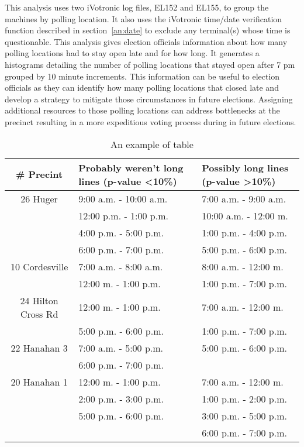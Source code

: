 This analysis uses two iVotronic log files, EL152 and EL155,  to group the machines by polling location. It also uses the iVotronic time/date verification function described in section~\ref{an:date} to exclude any terminal(s) whose time is questionable. This analysis gives election officials information about how many polling locations had to stay open late and for how long. It generates a histograms detailing the number of polling locations that stayed open after 7 pm grouped by 10 minute increments. This information can be useful to election officials as they can identify how many polling locations that closed late and develop a strategy to mitigate those circumstances in future elections. Assigning additional resources to those polling locations can address bottlenecks at the precinct resulting in a more expeditious voting process during in future elections.
\begin{table*}
    \begin{center}
    \begin{tabular}{| c | p{4cm} | p{3cm} |}
    \hline                   
    \# Precint & Probably weren't long lines (p-value \textless 10\%)&Possibly long lines (p-value \textgreater 10\%)\\
    \hline
    26 Huger&9:00 a.m. - 10:00 a.m. &7:00 a.m. - 9:00 a.m.\\
            &12:00 p.m. - 1:00 p.m. &10:00 a.m. - 12:00 m.\\
            &4:00 p.m. - 5:00 p.m. &1:00 p.m. - 4:00 p.m.\\
            &6:00 p.m. - 7:00 p.m. &5:00 p.m. - 6:00 p.m.\\
    \hline
    10 Cordesville &7:00 a.m. - 8:00 a.m.&8:00 a.m. - 12:00 m.\\
                   &12:00 m. - 1:00 p.m.&1:00 p.m. - 7:00 p.m.\\
    \hline  
    24 Hilton Cross Rd &12:00 m. - 1:00 p.m. &7:00 a.m. - 12:00 m.\\
                       &5:00 p.m. - 6:00 p.m. &1:00 p.m. - 7:00 p.m.\\
    \hline
    22 Hanahan 3 &7:00 a.m. - 5:00 p.m. &5:00 p.m. - 6:00 p.m.\\
                 &6:00 p.m. - 7:00 p.m.&\\
    \hline
    20 Hanahan 1 &12:00 m. - 1:00 p.m. &7:00 a.m. - 12:00 m.\\
                 &2:00 p.m. - 3:00 p.m. &1:00 p.m. - 2:00 p.m.\\
                 &5:00 p.m. - 6:00 p.m. &3:00 p.m. - 5:00 p.m.\\
                 &                      &6:00 p.m. - 7:00 p.m.\\
    \hline
    \end{tabular}
    \end{center}
    \caption{An example of table}
    \label{my_table}
\end{table*}
